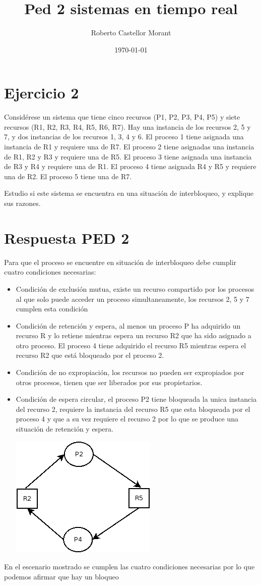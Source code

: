 \documentclass[a4paper,10pt]{article}
\author{Roberto Castellor Morant}
\title{Ped 2 sistemas en tiempo real}
\date{\today}
\begin{document}
\maketitle


\section{Ejercicio 2}

Considérese un sistema que tiene cinco recursos (P1, P2, P3, P4, P5) y siete
recursos (R1, R2, R3, R4, R5, R6, R7). Hay una instancia de los recursos 2, 5 
y 7, y dos instancias de los recursos 1, 3, 4 y 6. El proceso 1 tiene asignada
una instancia de R1 y requiere una de R7.  El proceso 2 tiene asignadas una 
instancia de R1, R2 y R3 y requiere una de R5. El proceso 3 tiene asignada una 
instancia de R3 y R4 y requiere una de R1. El proceso 4 tiene asignada R4 y R5 
y requiere una de R2. El proceso 5 tiene una de R7.


Estudio si este sistema se encuentra en una situación de interbloqueo, y 
explique sus razones.

\section{Respuesta PED 2}
Para que el proceso se encuentre en situación de interbloqueo debe cumplir
cuatro condiciones necesarias:

\begin{itemize}
	\item Condición de exclusión mutua, existe un recurso compartido por los
procesos al que solo puede acceder un proceso simultaneamente, los recursos 2, 5
y 7 cumplen esta condición
	\item Condición de retención y espera, al menos un proceso P ha
adquirido un recurso R y lo retiene mientras espera un recurso R2 que ha sido
asignado a otro proceso. El proceso 4 tiene adquirido el recurso R5 mientras
espera el recurso R2 que está bloqueado por el proceso 2.
	\item Condición de no expropiación, los recursos no pueden ser
expropiados por otros procesos, tienen que ser liberados por sus propietarios.
	\item Condición de espera circular, el proceso P2 tiene bloqueada la
unica instancia del recurso 2, requiere la instancia del recurso R5 que esta
bloqueada por el proceso 4 y que a su vez requiere el recurso 2 por lo que se
produce una situación de retención y espera.


		\includegraphics{condicion_circular}
\end{itemize}

En el escenario mostrado se cumplen las cuatro condiciones necesarias por lo que
podemos afirmar que hay un bloqueo
\end{document}
